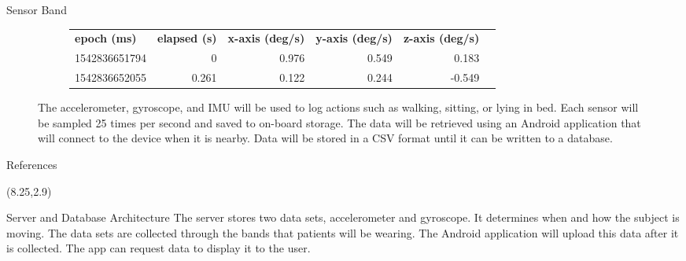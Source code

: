 \documentclass[22pt]{beamer}
\begin{document}
\begin{frame}[fragile]
\begin{textblock}{7.25}
\begin{block}{Sensor Band}
\begin{figure}
\begin{subfigure}{0.65\textwidth}
\vspace{1cm}
\end{subfigure}
\begin{subfigure}{0.80\textwidth}
\begin{tabular}{lrrrrr}\label{rawdata}
\textbf{epoch (ms)} & \textbf{elapsed (s)} & \textbf{x-axis (deg/s)} & \textbf{y-axis (deg/s)} & \textbf{z-axis (deg/s)} \\
1542836651794	& 0	& 0.976	& 0.549	& 0.183\\
1542836652055	& 0.261	& 0.122	& 0.244	& -0.549\\
\end{tabular}
\end{subfigure}

\caption{The accelerometer, gyroscope, and IMU will be used to log actions such as walking, sitting, or lying in bed. Each sensor will be sampled 25 times per second and saved to on-board storage. The data will be retrieved using an Android application that will connect to the device when it is nearby. Data will be stored in a CSV format until it can be written to a database.}
\end{figure}

\vspace{-1cm}
\end{block}

\begin{block}{References}
\printbibliography
\end{block}

\end{textblock}

\begin{textblock}{7.25}(8.25,2.9)
\vspace{0.5cm}
\begin{block}{Server and Database Architecture}
The server stores two data sets, accelerometer and gyroscope. It determines when and how the subject is moving.  The data sets are collected through the bands that patients will be wearing.  The Android application will upload this data after it is collected.  The app can request data to display it to the user.


\end{block}
\end{textblock}
\end{frame}
\end{document}
